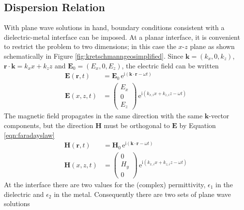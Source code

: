 \documentclass[a4paper,titlepage,onecolumn]{report}
\newcommand{\Figure}[1]{Figure \ref{#1}}
\newcommand{\Equation}[1]{Equation \ref{#1}}
\newcommand{\me}{{\mathrm{e}}}
\newcommand{\mi}{{\mathrm{i}}}
\begin{document}
\subsection{Dispersion Relation}
With plane wave solutions in hand, boundary conditions consistent with a
dielectric-metal interface can be imposed.
At a planar interface, it is convenient to restrict the problem to two
dimensions; in this case the $x$-$z$ plane as shown schematically in
\Figure{fig:kretschmanngeosimplified}.  Since $\mathbf{k}=(k_x,0,k_z)$,
$\mathbf{r}\cdot\mathbf{k}=k_x x + k_z z$ and $\mathbf{E}_0 = (E_x, 0,
E_z)$, the electric field can be written 
\begin{align}
\mathbf{E} ( \mathbf{r}, t ) &= \mathbf{E}_0\, \me^{\mi (\mathbf{k}
\cdot \mathbf{r} - \omega t )}\\
\mathbf{E}(x,z,t)&=\begin{pmatrix}
E_x\\ 0\\ E_z
\end{pmatrix}
\, \me^{\mi(k_{x,i}x+k_{z,i}z-\omega t)}
\label{eqn:planewavexz}
\end{align}
The magnetic field propagates in the same direction with the
same $\mathbf{k}$-vector components, but the direction
$\mathbf{H}$ must be orthogonal to $\mathbf{E}$ by
\Equation{eqn:faradayslaw}
\begin{align}
\mathbf{H} ( \mathbf{r}, t ) &= \mathbf{H}_0\, \me^{\mi (\mathbf{k}
\cdot \mathbf{r} - \omega t )}\\
\mathbf{H}(x,z,t)&=\begin{pmatrix}
0\\ H_y\\ 0
\end{pmatrix}
\, \me^{\mi(k_{x,i}x+k_{z,i}z-\omega t)}
\end{align}
At the interface there are two values for the (complex) permittivity,
$\epsilon_1$ in the dielectric and $\epsilon_2$ in the metal.  Consequently
there are two sets of plane wave solutions
\end{document}
